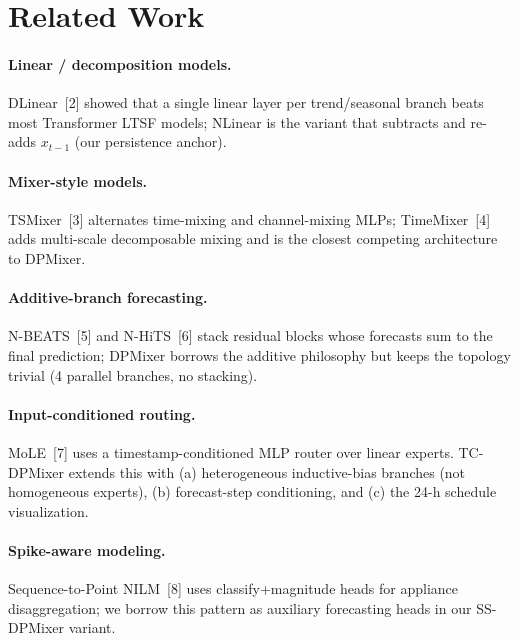 \documentclass[11pt,letterpaper]{article}
\begin{document}
\section{Related Work}

\paragraph{Linear / decomposition models.} DLinear~[2] showed that a single
linear layer per trend/seasonal branch beats most Transformer LTSF models;
NLinear is the variant that subtracts and re-adds $x_{t-1}$ (our persistence
anchor).

\paragraph{Mixer-style models.} TSMixer~[3] alternates time-mixing and
channel-mixing MLPs; TimeMixer~[4] adds multi-scale decomposable mixing and
is the closest competing architecture to DPMixer.

\paragraph{Additive-branch forecasting.} N-BEATS~[5] and N-HiTS~[6] stack
residual blocks whose forecasts sum to the final prediction; DPMixer borrows
the additive philosophy but keeps the topology trivial (4 parallel branches,
no stacking).

\paragraph{Input-conditioned routing.} MoLE~[7] uses a timestamp-conditioned
MLP router over linear experts. TC-DPMixer extends this with (a) heterogeneous
inductive-bias branches (not homogeneous experts), (b) forecast-step
conditioning, and (c) the 24-h schedule visualization.

\paragraph{Spike-aware modeling.} Sequence-to-Point NILM~[8] uses
classify+magnitude heads for appliance disaggregation; we borrow this
pattern as auxiliary forecasting heads in our SS-DPMixer variant.

\end{document}

